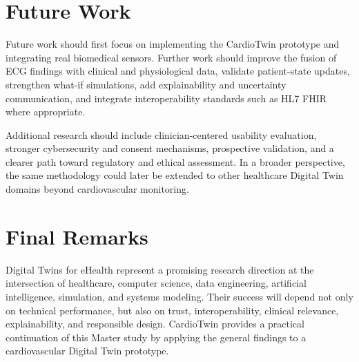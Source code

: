 \section{Future Work}
Future work should first focus on implementing the CardioTwin prototype and integrating real biomedical sensors. Further work should improve the fusion of ECG findings with clinical and physiological data, validate patient-state updates, strengthen what-if simulations, add explainability and uncertainty communication, and integrate interoperability standards such as HL7 FHIR where appropriate.

Additional research should include clinician-centered usability evaluation, stronger cybersecurity and consent mechanisms, prospective validation, and a clearer path toward regulatory and ethical assessment. In a broader perspective, the same methodology could later be extended to other healthcare Digital Twin domains beyond cardiovascular monitoring.

\section{Final Remarks}
Digital Twins for eHealth represent a promising research direction at the intersection of healthcare, computer science, data engineering, artificial intelligence, simulation, and systems modeling. Their success will depend not only on technical performance, but also on trust, interoperability, clinical relevance, explainability, and responsible design. CardioTwin provides a practical continuation of this Master study by applying the general findings to a cardiovascular Digital Twin prototype.

\clearpage
